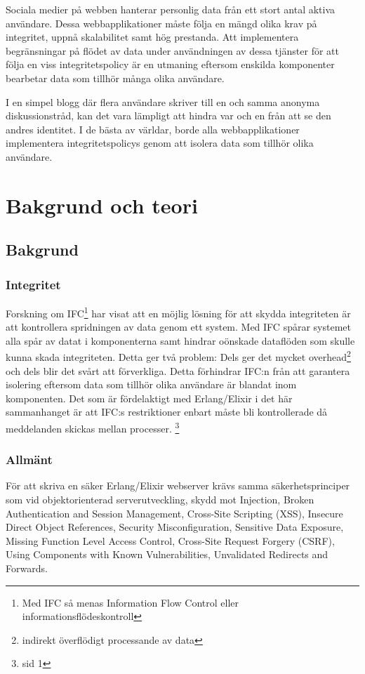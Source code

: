\documentclass[12pt]{article}
\begin{document}
Sociala medier på webben hanterar personlig data från ett stort antal aktiva användare.
Dessa webbapplikationer måste följa en mängd olika krav på integritet, uppnå skalabilitet samt hög prestanda.
Att implementera begränsningar på flödet av data under användningen av dessa tjänster för att följa en viss integritetspolicy är en utmaning eftersom enskilda komponenter bearbetar data som tillhör många olika användare.

I en simpel blogg där flera användare skriver till en och samma anonyma diskussionstråd, kan det vara lämpligt att hindra var och en från att se den andres identitet.
I de bästa av världar, borde alla webbapplikationer implementera integritetspolicys genom att isolera data som tillhör olika användare.



 \section{Bakgrund och teori}

\subsection{Bakgrund}

\subsubsection*{Integritet}


Forskning om IFC\footnote{Med IFC så menas Information Flow Control eller informationsflödeskontroll} har visat att en möjlig lösning för att skydda integriteten är att kontrollera spridningen av data genom ett system.
Med IFC spårar systemet alla spår av datat i komponenterna samt hindrar oönskade dataflöden som skulle kunna skada integriteten.
Detta ger två problem:
Dels ger det mycket overhead\footnote{indirekt överflödigt processande av data} och dels blir det svårt att förverkliga.
Detta förhindrar IFC:n från att garantera isolering eftersom data som tillhör olika användare är blandat inom komponenten.
Det som är fördelaktigt med Erlang/Elixir i det här sammanhanget är att IFC:s restriktioner enbart måste bli kontrollerade då meddelanden skickas mellan processer.
 \footnote{sid 1\cite{IFC}}
\subsubsection*{Allmänt}
	För att skriva en säker Erlang/Elixir webserver krävs samma säkerhetsprinciper som vid objektorienterad serverutveckling, skydd mot Injection, Broken Authentication and Session Management, Cross-Site Scripting (XSS), Insecure Direct Object References, Security Misconfiguration, Sensitive Data Exposure, Missing Function Level Access Control, Cross-Site Request Forgery (CSRF), Using Components with Known Vulnerabilities, Unvalidated Redirects and Forwards.\cite{owasp}	
\end{document}
